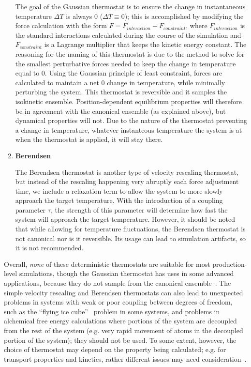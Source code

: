 \documentclass[9pt,bestpractices]{livecoms}
\begin{document}
\begin{enumerate}[listparindent=\parindent]
        The goal of the Gaussian thermostat is to ensure the change in instantaneous temperature $\Delta T$ is always 0 ($\Delta T \equiv 0$); this is accomplished by modifying the force calculation with the form $F = F_{interaction} + F_{constraint}$, where $F_{interaction}$ is the standard interactions calculated during the course of the simulation and $F_{constraint}$ is a Lagrange multiplier that keeps the kinetic energy constant.
        The reasoning for the naming of this thermostat is due to the method to solve for the smallest perturbative forces needed to keep the change in temperature equal to 0.
        Using the Gaussian principle of least constraint, forces are calculated to maintain a net 0 change in temperature, while minimally perturbing the system\cite{thermostatAlgorithms2005}.
        This thermostat is reversible and it samples the isokinetic ensemble.
        Position-dependent equilibrium properties will therefore be in agreement with the canonical ensemble (as explained above), but dynamical properties will not.
        Due to the nature of the thermostat preventing a change in temperature, whatever instanteous temperature the system is at when the thermostat is applied, it will stay there. 

    \item \textbf{Berendsen}

        The Berendsen thermostat is another type of velocity rescaling thermostat, but instead of the rescaling happening very abruptly each force adjustment time, we include a relaxation term to allow the system to more slowly approach the target temperature\cite{berendsen1984molecular}.
        With the introduction of a coupling parameter $\tau$, the strength of this parameter will determine how fast the system will approach the target temperature.
        However, it should be noted that while allowing for temperature fluctuations, the Berendsen thermostat is not canonical nor is it reversible.
        Its usage can lead to simulation artifacts, so it is not recommended\cite{Braun:2018:arXiv}.

\end{enumerate}

Overall, \emph{none} of these deterministic thermostats are suitable for most production-level simulations, though the Gaussian thermostat has uses in some advanced applications\cite{Minary:2002:JChemPhysAlgorithms}, because they do not sample from the canonical ensemble~\cite{Shirts:2013:J.Chem.TheoryComput.}.
The simple velocity rescaling and Berendsen thermostats can also lead to unexpected problems in systems with weak or poor coupling between degrees of freedom, such as the ``flying ice cube''~\cite{Harvey:1998:JCompChem} problem in some systems, and problems in alchemical free energy calculations where portions of the system are decoupled from the rest of the system (e.g. very rapid movement of atoms in the decoupled portion of the system); they should not be used.
To some extent, however, the choice of thermostat may depend on the property being calculated; e.g. for transport properties and kinetics, rather different issues may need consideration~\cite{Basconi:2013:J.Chem.TheoryComput.}.
\end{document}
